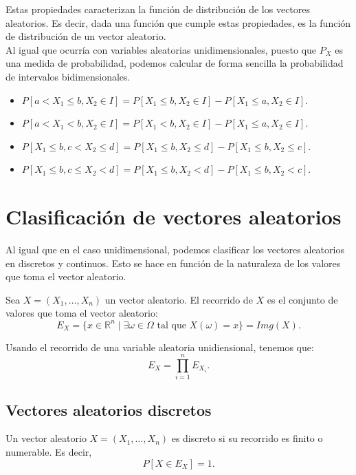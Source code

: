 Estas propiedades caracterizan la función de distribución de los vectores aleatorios. Es decir,
dada una función que cumple estas propiedades, es la función de distribución de un vector aleatorio.\\

Al igual que ocurría con variables aleatorias unidimensionales, puesto que $P_X$ es una medida de probabilidad, podemos calcular de forma sencilla la probabilidad de intervalos bidimensionales.
\begin{itemize}
    \item $P[a < X_1 \leq b, X_2 \in I] = P[X_1 \leq b, X_2 \in I] - P[X_1 \leq a, X_2 \in I]$.
    \item $P[a < X_1 < b, X_2 \in I] = P[X_1 < b, X_2 \in I] - P[X_1 \leq a, X_2 \in I]$.
    \item $P[X_1 \leq b, c < X_2 \leq d] = P[X_1 \leq b, X_2 \leq d] - P[X_1 \leq b, X_2 \leq c]$.
    \item $P[X_1 \leq b, c \leq X_2 < d] = P[X_1 \leq b, X_2 < d] - P[X_1 \leq b, X_2 < c]$.
\end{itemize}



\section{Clasificación de vectores aleatorios}

Al igual que en el caso unidimensional, podemos clasificar los vectores aleatorios en discretos y continuos. Esto se hace en función de la naturaleza de los valores que toma el vector aleatorio.
\begin{definicion}
    Sea $X=(X_1, \ldots, X_n)$ un vector aleatorio. El recorrido de $X$ es el conjunto de valores que toma el vector aleatorio:
    \begin{equation*}
        E_X = \{x\in \mathbb{R}^n \mid \exists \omega\in \Omega \text{ tal que } X(\omega) = x\}
        = Img(X).
    \end{equation*}
\end{definicion}

Usando el recorrido de una variable aleatoria unidiensional, tenemos que:
\begin{equation*}
    E_X = \prod_{i=1}^n E_{X_i}.
\end{equation*}


\subsection{Vectores aleatorios discretos}
\begin{definicion}
    Un vector aleatorio $X=(X_1, \ldots, X_n)$ es discreto si su recorrido es finito o numerable.
    Es decir,
    \begin{equation*}
        P[X\in E_X] = 1.
    \end{equation*}
\end{definicion}

